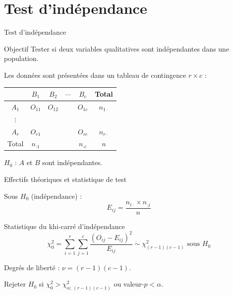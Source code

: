 \documentclass{BeamerTemplate}
\begin{document}
\section{Test d'indépendance}

\begin{frame}[t]{Test d'indépendance}

\begin{Boite}{Objectif}
Tester si deux variables qualitatives sont \alert{indépendantes} dans une population.
\end{Boite}

\medskip
Les données sont présentées dans un \alert{tableau de contingence} $r \times c$ :

\begin{center}
\begin{tabular}{c|cccc|c}
 & $B_1$ & $B_2$ & $\cdots$ & $B_c$ & Total \\ \hline
$A_1$ & $O_{11}$ & $O_{12}$ & & $O_{1c}$ & $n_{1\cdot}$ \\
$\vdots$ & & & & & \\
$A_r$ & $O_{r1}$ & & & $O_{rc}$ & $n_{r\cdot}$ \\ \hline
Total & $n_{\cdot 1}$ & & & $n_{\cdot c}$ & $n$ \\
\end{tabular}
\end{center}

$H_0$ : $A$ et $B$ sont indépendantes.

\end{frame}

\begin{frame}[t]{Effectifs théoriques et statistique de test}

Sous $H_0$ (indépendance) :
$$E_{ij} = \frac{n_{i\cdot} \times n_{\cdot j}}{n}$$

\begin{Boite}{Statistique du khi-carré d'indépendance}
$$\chi^2_0 = \sum_{i=1}^{r}\sum_{j=1}^{c} \frac{(O_{ij} - E_{ij})^2}{E_{ij}} \;\dot{\sim}\; \chi^2_{(r-1)(c-1)} \text{ sous } H_0$$
\end{Boite}

\medskip
Degrés de liberté : $\nu = (r-1)(c-1)$.

\medskip
Rejeter $H_0$ si $\chi^2_0 > \chi^2_{\alpha;\,(r-1)(c-1)}$ ou valeur-$p < \alpha$.

\end{frame}
\end{document}
